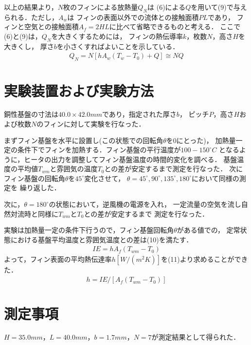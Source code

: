\documentclass[twocolumn, 10pt,a4j]{jsarticle}
\begin{document}
      \par 以上の結果より，$N$枚のフィンによる放熱量$Q_{N}$は
    (6)による$Q$を用いて(9)で与えられる．ただし，$A_{w}$は
    フィンの表面以外での流体との接触面積$PL$であり，
    フィンと空気との接触面積$A_{f}=2HL$に比べて省略できるものと考える．
    ここで(6)と(9)は，$Q_{N}$を大きくするためには，
    フィンの熱伝導率$k$，枚数$N$，高さ$H$を大きくし，
    厚さ$b$を小さくすればよいことを示している．
    \begin{eqnarray}
      Q_{N} = N[hA_{w} (T_{w} - T_{0}) + Q] \cong NQ
    \end{eqnarray}

\section{実験装置および実験方法}
    \par 銅性基盤の寸法は$40.0 \times 42.0 mm$であり，指定された厚さ$b$，
  ピッチ$P$，高さ$H$および枚数$N$のフィンに対して実験を行なった．
    \par まずフィン基盤を水平に設置し(この状態での回転角$\theta$を0にとった)，
  加熱量一定の条件下でフィンを加熱する．フィン基盤の平行温度が$100 - 150 ^\circ C$
  となるように，ヒータの出力を調整してフィン基盤温度の時間的変化を調べる．
  基盤温度の平均値$T_{wm}$と雰囲気の温度$T_{0}$との差が安定するまで測定を行なった．
  次にフィン基盤の回転角$\theta$を$45^\circ$変化させて，
  $\theta = 45^\circ, 90^\circ, 135^\circ, 180^\circ$において同様の測定を
  繰り返した．
    \par 次に，$\theta = 180^\circ$の状態において，逆風機の電源を入れ，
    一定流量の空気を流し自然対流時と同様に$T_{wm}$と$T_{0}$との差が安定するまで
  測定を行なった．
    \par 実験は加熱量一定の条件下行うので，フィン基盤回転角$\theta$がある値での，
  定常状態における基盤平均温度と雰囲気温度との差は(10)を満たす．
    \begin{eqnarray}
      IE = hA_{f}(T_{wm} - T_{0})
    \end{eqnarray}
  よって，フィン表面の平均熱伝達率$h[W/(m^{2}K)]$を(11)より求めることができた．
    \begin{eqnarray}
      h = IE / [A_{f}(T_{wm} - T_{0})]
    \end{eqnarray}
\section{測定事項}
$H=35.0mm，L=40.0mm，b=1.7mm，N=7$が測定結果として得られた．
\end{document}
